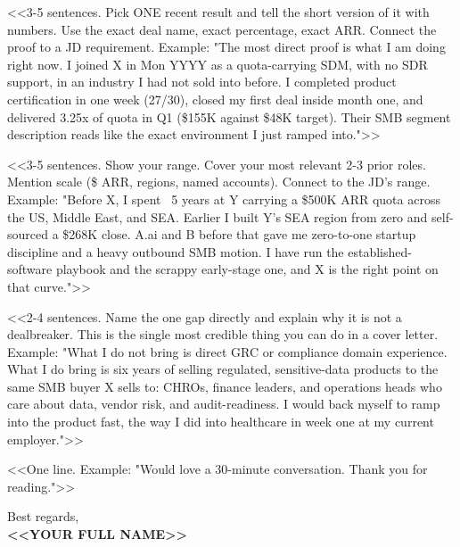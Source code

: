 \documentclass[11pt, letterpaper]{article}
\begin{document}
<<3-5 sentences. Pick ONE recent result and tell the short version of it
with numbers. Use the exact deal name, exact percentage, exact ARR. Connect
the proof to a JD requirement. Example:
"The most direct proof is what I am doing right now. I joined X in Mon YYYY
as a quota-carrying SDM, with no SDR support, in an industry I had not sold
into before. I completed product certification in one week (27/30), closed
my first deal inside month one, and delivered 3.25x of quota in Q1 (\$155K
against \$48K target). Their SMB segment description reads like the exact
environment I just ramped into.">>

<<3-5 sentences. Show your range. Cover your most relevant 2-3 prior roles.
Mention scale (\$ ARR, regions, named accounts). Connect to the JD's range.
Example:
"Before X, I spent ~5 years at Y carrying a \$500K ARR quota across the US,
Middle East, and SEA. Earlier I built Y's SEA region from zero and self-sourced
a \$268K close. A.ai and B before that gave me zero-to-one startup discipline
and a heavy outbound SMB motion. I have run the established-software playbook
and the scrappy early-stage one, and X is the right point on that curve.">>

<<2-4 sentences. Name the one gap directly and explain why it is not a
dealbreaker. This is the single most credible thing you can do in a cover
letter. Example:
"What I do not bring is direct GRC or compliance domain experience. What I
do bring is six years of selling regulated, sensitive-data products to the
same SMB buyer X sells to: CHROs, finance leaders, and operations heads who
care about data, vendor risk, and audit-readiness. I would back myself to
ramp into the product fast, the way I did into healthcare in week one at my current employer.">>

<<One line. Example: "Would love a 30-minute conversation. Thank you for reading.">>

\vspace{4pt}

\noindent Best regards,\\[10pt]
\textbf{<<YOUR FULL NAME>>}
\end{document}
